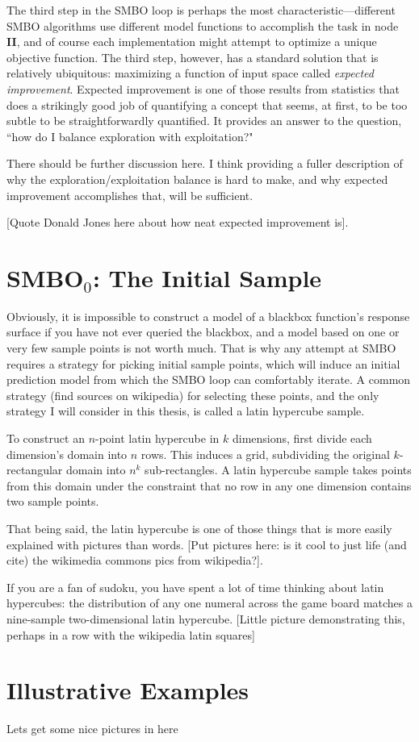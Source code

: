 The third step in the SMBO loop is perhaps the most characteristic---different SMBO algorithms use different model functions to accomplish the task in node \textbf{II}, and of course each implementation might attempt to optimize a unique objective function. The third step, however, has a standard solution that is relatively ubiquitous: maximizing a function of input space called \emph{expected improvement}. Expected improvement is one of those results from statistics that does a strikingly good job of quantifying a concept that seems, at first, to be too subtle to be straightforwardly quantified. It provides an answer to the question, ``how do I balance exploration with exploitation?"

There should be further discussion here. I think providing a fuller description of why the exploration/exploitation balance is hard to make, and why expected improvement accomplishes that, will be sufficient.

[Quote Donald Jones here about how neat expected improvement is].

\section{SMBO$_0$: The Initial Sample}

Obviously, it is impossible to construct a model of a blackbox function's response surface if you have not ever queried the blackbox, and a model based on one or very few sample points is not worth much. That is why any attempt at SMBO requires a strategy for picking initial sample points, which will induce an initial prediction model from which the SMBO loop can comfortably iterate. A common strategy (find sources on wikipedia) for selecting these points, and the only strategy I will consider in this thesis, is called a latin hypercube sample.

To construct an $n$-point latin hypercube in $k$ dimensions, first divide each dimension's domain into $n$ rows. This induces a grid, subdividing the original $k$-rectangular domain into $n^k$ sub-rectangles. A latin hypercube sample takes points from this domain under the constraint that no row in any one dimension contains two sample points.

That being said, the latin hypercube is one of those things that is more easily explained with pictures than words. [Put pictures here: is it cool to just life (and cite) the wikimedia commons pics from wikipedia?].

If you are a fan of sudoku, you have spent a lot of time thinking about latin hypercubes: the distribution of any one numeral across the game board matches a nine-sample two-dimensional latin hypercube. [Little picture demonstrating this, perhaps in a row with the wikipedia latin squares]


\section{Illustrative Examples}
Lets get some nice pictures in here




